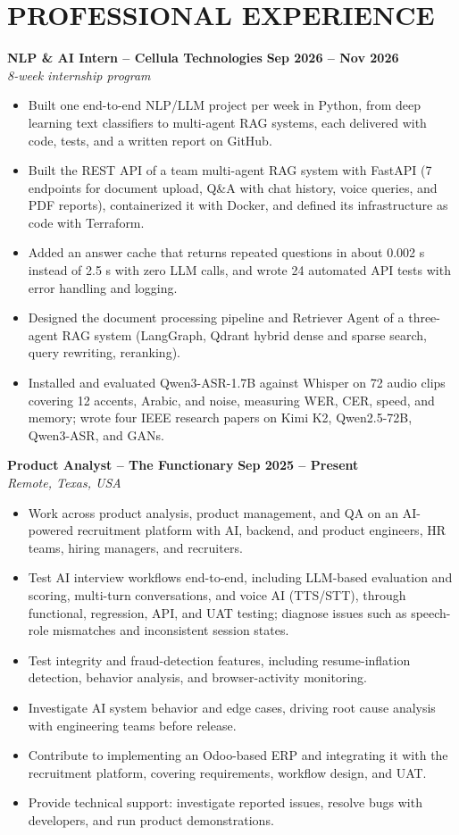 \documentclass[10pt]{article}
\newcommand{\role}[3]{\textbf{#1} \hfill \textbf{#3}\\{\small\itshape #2}\par}
\begin{document}
\section{PROFESSIONAL EXPERIENCE}
\role{NLP \& AI Intern -- Cellula Technologies}{8-week internship program}{Sep 2026 -- Nov 2026}
\begin{itemize}
\item Built one end-to-end NLP/LLM project per week in Python, from deep learning text classifiers to multi-agent RAG systems, each delivered with code, tests, and a written report on GitHub.
\item Built the REST API of a team multi-agent RAG system with FastAPI (7 endpoints for document upload, Q\&A with chat history, voice queries, and PDF reports), containerized it with Docker, and defined its infrastructure as code with Terraform.
\item Added an answer cache that returns repeated questions in about 0.002 s instead of 2.5 s with zero LLM calls, and wrote 24 automated API tests with error handling and logging.
\item Designed the document processing pipeline and Retriever Agent of a three-agent RAG system (LangGraph, Qdrant hybrid dense and sparse search, query rewriting, reranking).
\item Installed and evaluated Qwen3-ASR-1.7B against Whisper on 72 audio clips covering 12 accents, Arabic, and noise, measuring WER, CER, speed, and memory; wrote four IEEE research papers on Kimi K2, Qwen2.5-72B, Qwen3-ASR, and GANs.
\end{itemize}

\role{Product Analyst -- The Functionary}{Remote, Texas, USA}{Sep 2025 -- Present}
\begin{itemize}
\item Work across product analysis, product management, and QA on an AI-powered recruitment platform with AI, backend, and product engineers, HR teams, hiring managers, and recruiters.
\item Test AI interview workflows end-to-end, including LLM-based evaluation and scoring, multi-turn conversations, and voice AI (TTS/STT), through functional, regression, API, and UAT testing; diagnose issues such as speech-role mismatches and inconsistent session states.
\item Test integrity and fraud-detection features, including resume-inflation detection, behavior analysis, and browser-activity monitoring.
\item Investigate AI system behavior and edge cases, driving root cause analysis with engineering teams before release.
\item Contribute to implementing an Odoo-based ERP and integrating it with the recruitment platform, covering requirements, workflow design, and UAT.
\item Provide technical support: investigate reported issues, resolve bugs with developers, and run product demonstrations.
\end{itemize}
\end{document}
